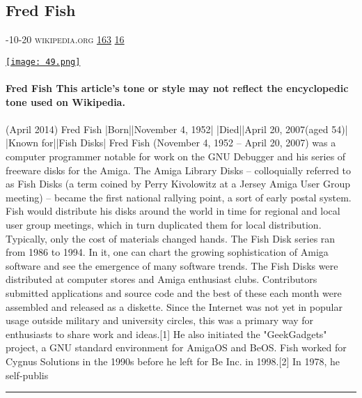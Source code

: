 \documentclass[10pt,a4paper]{article}
\begin{document}
\begin{multicols*}{2}
\begin{minipage}{\linewidth}
\subsection{Fred Fish}
\textsc{\footnotesize
{\scriptsize\faCalendar}-10-20 
{\scriptsize\faGlobe}\space 
wikipedia.org 
{\scriptsize\faThumbsOUp}\space 
\href{http://news.ycombinator.com/item?id=37148062\&utm\_term=comment}{163} 
{\scriptsize\faComments}\space 
\href{http://news.ycombinator.com/item?id=37148062\&utm\_term=comment}{16} 
}
\par\medskip\noindent
\href{https://en.wikipedia.org/wiki/Fred\_Fish?utm\_source=hackernewsletter\&utm\_medium=email\&utm\_term=learn}{
    \texttt{[image: 49.png]}
}
\end{minipage}
\paragraph{}
\textbf{Fred Fish
This article's tone or style may not reflect the encyclopedic tone used on Wikipedia.}
\paragraph{}
 (April 2014)
Fred Fish
|Born||November 4, 1952|
|Died||April 20, 2007(aged 54)|
|Known for||Fish Disks|
Fred Fish (November 4, 1952 – April 20, 2007) was a computer programmer notable for work on the GNU Debugger and his series of freeware disks for the Amiga.
The Amiga Library Disks – colloquially referred to as Fish Disks (a term coined by Perry Kivolowitz at a Jersey Amiga User Group meeting) – became the first national rallying point, a sort of early postal system. Fish would distribute his disks around the world in time for regional and local user group meetings, which in turn duplicated them for local distribution. Typically, only the cost of materials changed hands. The Fish Disk series ran from 1986 to 1994. In it, one can chart the growing sophistication of Amiga software and see the emergence of many software trends.
The Fish Disks were distributed at computer stores and Amiga enthusiast clubs. Contributors submitted applications and source code and the best of these each month were assembled and released as a diskette. Since the Internet was not yet in popular usage outside military and university circles, this was a primary way for enthusiasts to share work and ideas.[1] He also initiated the "GeekGadgets" project, a GNU standard environment for AmigaOS and BeOS.
Fish worked for Cygnus Solutions in the 1990s before he left for Be Inc. in 1998.[2]
In 1978, he self-publis
\par\noindent\textcolor{red}{\rule{\linewidth}{0.2mm}}
\vfill
\null
\noindent\begin{minipage}{\linewidth}

\end{minipage}
\end{multicols*}
\end{document}
